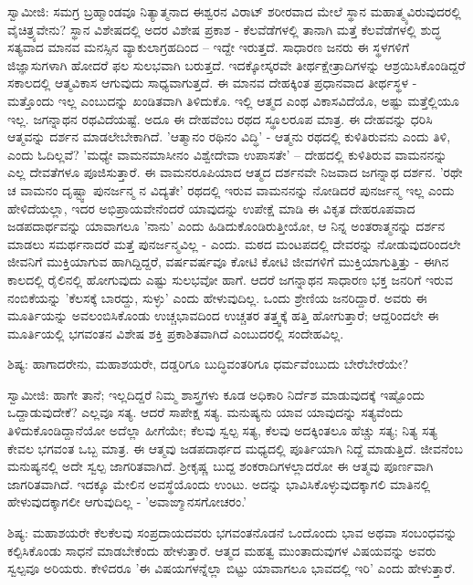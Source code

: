 ಸ್ವಾಮೀಜಿ: ಸಮಗ್ರ ಬ್ರಹ್ಮಾಂಡವೂ ನಿತ್ಯಾತ್ಮನಾದ ಈಶ್ವರನ ವಿರಾಟ್ ಶರೀರವಾದ ಮೇಲೆ ಸ್ಥಾನ ಮಹಾತ್ಮ್ಯವಿರುವುದರಲ್ಲಿ ವೈಚಿತ್ರ್ಯವೇನು? ಸ್ಥಾನ ವಿಶೇಷದಲ್ಲಿ ಅದರ ವಿಶೇಷ ಪ್ರಕಾಶ - ಕೆಲವೆಡೆಗಳಲ್ಲಿ ತಾನಾಗಿ ಮತ್ತೆ ಕೆಲವೆಡೆಗಳಲ್ಲಿ ಶುದ್ಧ ಸತ್ಯವಾದ ಮಾನವ ಮನಸ್ಸಿನ ವ್ಯಾಕುಲಾಗ್ರಹದಿಂದ – ಇದ್ದೇ ಇರುತ್ತದೆ. ಸಾಧಾರಣ ಜನರು ಈ ಸ್ಥಳಗಳಿಗೆ ಜಿಜ್ಞಾಸುಗಳಾಗಿ ಹೋದರೆ ಫಲ ಸುಲಭವಾಗಿ ಬರುತ್ತದೆ. ಇದಕ್ಕೋಸ್ಕರವೇ ತೀರ್ಥಕ್ಷೇತ್ರಾದಿಗಳನ್ನು ಆಶ್ರಯಿಸಿಕೊಂಡಿದ್ದರೆ ಸಕಾಲದಲ್ಲಿ ಆತ್ಮವಿಕಾಸ ಆಗುವುದು ಸಾಧ್ಯವಾಗುತ್ತದೆ. ಈ ಮಾನವ ದೇಹಕ್ಕಿಂತ ಪ್ರಧಾನವಾದ ತೀರ್ಥಸ್ಥಳ - ಮತ್ತೊಂದು ಇಲ್ಲ ಎಂಬುದನ್ನು ಖಂಡಿತವಾಗಿ ತಿಳಿದುಕೊ. ಇಲ್ಲಿ ಆತ್ಮದ ಎಂಥ ವಿಕಾಸವಿದೆಯೊ, ಅಷ್ಟು ಮತ್ತೆಲ್ಲಿಯೂ ಇಲ್ಲ. ಜಗನ್ನಾಥನ ರಥವಿದೆಯಷ್ಟೆ. ಅದೂ ಈ ದೇಹವೆಂಬ ರಥದ ಸ್ಥೂಲರೂಪ ಮಾತ್ರ. ಈ ದೇಹವನ್ನು ಧರಿಸಿ ಆತ್ಮವನ್ನು ದರ್ಶನ ಮಾಡಲೇಬೇಕಾಗಿದೆ. 'ಆತ್ಮಾನಂ ರಥಿನಂ ವಿದ್ಧಿ' - ಆತ್ಮನು ರಥದಲ್ಲಿ ಕುಳಿತಿರುವನು ಎಂದು ತಿಳಿ, ಎಂದು ಓದಿಲ್ಲವೆ? 'ಮಧ್ಯೇ ವಾಮನಮಾಸೀನಂ ವಿಶ್ವೇದೇವಾ ಉಪಾಸತೇ' – ದೇಹದಲ್ಲಿ ಕುಳಿತಿರುವ ವಾಮನನನ್ನು ಎಲ್ಲ ದೇವತೆಗಳೂ ಪೂಜಿಸುತ್ತಾರೆ. ಈ ವಾಮನರೂಪಿಯಾದ ಆತ್ಮದ ದರ್ಶನವೇ ನಿಜವಾದ ಜಗನ್ನಾಥ ದರ್ಶನ. 'ರಥೇ ಚ ವಾಮನಂ ದೃಷ್ಟ್ವಾ ಪುನರ್ಜನ್ಮ ನ ವಿದ್ಯತೇ' ರಥದಲ್ಲಿ ಇರುವ ವಾಮನನನ್ನು ನೋಡಿದರೆ ಪುನರ್ಜನ್ಮ ಇಲ್ಲ ಎಂದು ಹೇಳಿದೆಯಲ್ಲಾ, ಇದರ ಅಭಿಪ್ರಾಯವೇನೆಂದರೆ ಯಾವುದನ್ನು ಉಪೇಕ್ಷೆ ಮಾಡಿ ಈ ವಿಕೃತ ದೇಹರೂಪವಾದ ಜಡಪದಾರ್ಥವನ್ನು ಯಾವಾಗಲೂ 'ನಾನು' ಎಂದು ಹಿಡಿದುಕೊಂಡಿರುತ್ತೀಯೋ, ಆ ನಿನ್ನ ಅಂತರಾತ್ಮನನ್ನು ದರ್ಶನ ಮಾಡಲು ಸಮರ್ಥನಾದರೆ ಮತ್ತೆ ಪುನರ್ಜನ್ಮವಿಲ್ಲ - ಎಂದು. ಮಠದ ಮಂಟಪದಲ್ಲಿ ದೇವರನ್ನು ನೋಡುವುದರಿಂದಲೇ ಜೀವನಿಗೆ ಮುಕ್ತಿಯಾಗುವ ಹಾಗಿದ್ದಿದ್ದರೆ, ವರ್ಷವರ್ಷವೂ ಕೋಟಿ ಕೋಟಿ ಜೀವಗಳಿಗೆ ಮುಕ್ತಿಯಾಗುತ್ತಿತ್ತು - ಈಗಿನ ಕಾಲದಲ್ಲಿ ರೈಲಿನಲ್ಲಿ ಹೋಗುವುದು ಎಷ್ಟು ಸುಲಭವೋ ಹಾಗೆ. ಆದರೆ ಜಗನ್ನಾಥನ ಸಾಧಾರಣ ಭಕ್ತ ಜನರಿಗೆ ಇರುವ ನಂಬಿಕೆಯನ್ನು 'ಕೆಲಸಕ್ಕೆ ಬಾರದ್ದು, ಸುಳ್ಳು' ಎಂದು ಹೇಳುವುದಿಲ್ಲ. ಒಂದು ಶ್ರೇಣಿಯ ಜನರಿದ್ದಾರೆ. ಅವರು ಈ ಮೂರ್ತಿಯನ್ನು ಅವಲಂಬಿಸಿಕೊಂಡು ಉಚ್ಚಭಾವದಿಂದ ಉಚ್ಚತರ ತತ್ತ್ವಕ್ಕೆ ಹತ್ತಿ ಹೋಗುತ್ತಾರೆ; ಆದ್ದರಿಂದಲೇ ಈ ಮೂರ್ತಿಯಲ್ಲಿ ಭಗವಂತನ ವಿಶೇಷ ಶಕ್ತಿ ಪ್ರಕಾಶಿತವಾಗಿದೆ ಎಂಬುದರಲ್ಲಿ ಸಂದೇಹವಿಲ್ಲ.

ಶಿಷ್ಯ: ಹಾಗಾದರೇನು, ಮಹಾಶಯರೇ, ದಡ್ಡರಿಗೂ ಬುದ್ಧಿವಂತರಿಗೂ ಧರ್ಮವೆಂಬುದು ಬೇರೆಬೇರೆಯೇ?

ಸ್ವಾಮೀಜಿ: ಹಾಗೇ ತಾನೆ; ಇಲ್ಲದಿದ್ದರೆ ನಿಮ್ಮ ಶಾಸ್ತ್ರಗಳು ಕೂಡ ಅಧಿಕಾರಿ ನಿರ್ದೆಶ ಮಾಡುವುದಕ್ಕೆ ಇಷ್ಟೊಂದು ಒದ್ದಾಡುವುದೇಕೆ? ಎಲ್ಲವೂ ಸತ್ಯ. ಆದರೆ ಸಾಪೇಕ್ಷ ಸತ್ಯ. ಮನುಷ್ಯನು ಯಾವ ಯಾವುದನ್ನು ಸತ್ಯವೆಂದು ತಿಳಿದುಕೊಂಡಿದ್ದಾನೆಯೋ ಅದೆಲ್ಲಾ ಹೀಗೆಯೇ; ಕೆಲವು ಸ್ವಲ್ಪ ಸತ್ಯ, ಕೆಲವು ಅದಕ್ಕಿಂತಲೂ ಹೆಚ್ಚು ಸತ್ಯ; ನಿತ್ಯ ಸತ್ಯ ಕೇವಲ ಭಗವಂತ ಒಬ್ಬ ಮಾತ್ರ. ಈ ಆತ್ಮವು ಜಡಪದಾರ್ಥದ ಮಧ್ಯದಲ್ಲಿ ಪೂರ್ತಿಯಾಗಿ ನಿದ್ದೆ ಮಾಡುತ್ತಿದೆ. ಜೀವನೆಂಬ ಮನುಷ್ಯನಲ್ಲಿ ಅದೇ ಸ್ವಲ್ಪ ಜಾಗರಿತವಾಗಿದೆ. ಶ‍್ರೀಕೃಷ್ಣ ಬುದ್ದ ಶಂಕರಾದಿಗಳಲ್ಲಾದರೋ ಈ ಆತ್ಮವು ಪೂರ್ಣವಾಗಿ ಜಾಗರಿತವಾಗಿದೆ. ಇದಕ್ಕೂ ಮೇಲಿನ ಅವಸ್ಥೆಯೊಂದು ಉಂಟು. ಅದನ್ನು ಭಾವಿಸಿಕೊಳ್ಳುವುದಕ್ಕಾಗಲಿ ಮಾತಿನಲ್ಲಿ ಹೇಳುವುದಕ್ಕಾಗಲೀ ಆಗುವುದಿಲ್ಲ - 'ಅವಾಙ್ಮಾನಸಗೋಚರಂ.'

ಶಿಷ್ಯ: ಮಹಾಶಯರೇ ಕೆಲಕೆಲವು ಸಂಪ್ರದಾಯದವರು ಭಗವಂತನೊಡನೆ ಒಂದೊಂದು ಭಾವ ಅಥವಾ ಸಂಬಂಧವನ್ನು ಕಲ್ಪಿಸಿಕೊಂಡು ಸಾಧನೆ ಮಾಡಬೇಕೆಂದು ಹೇಳುತ್ತಾರೆ. ಆತ್ಮದ ಮಹತ್ವ ಮುಂತಾದುವುಗಳ ವಿಷಯವನ್ನು ಅವರು ಸ್ವಲ್ಪವೂ ಅರಿಯರು. ಕೇಳಿದರೂ 'ಈ ವಿಷಯಗಳನ್ನೆಲ್ಲಾ ಬಿಟ್ಟು ಯಾವಾಗಲೂ ಭಾವದಲ್ಲಿ ಇರಿ' ಎಂದು ಹೇಳುತ್ತಾರೆ.

